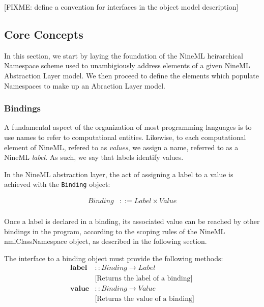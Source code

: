 \documentclass[a4paper]{article}
\newcommand\nmlClass[1]{{\tt #1}}
\begin{document}
[FIXME: define a convention for interfaces in the object model description]

\subsection{Core Concepts}

In this section, we start by laying the foundation of the NineML
heirarchical Namespace scheme used to unambigiously address elements
of a given NineML Abstraction Layer model.  We then proceed to define the elements
which populate Namespaces to make up an Abraction Layer model.

\subsubsection{Bindings}

A fundamental aspect of the organization of most programming languages
is to use names to refer to computational entities.  Likewise, to each
computational element of NineML, refered to as \emph{values}, we
assign a name, referred to as a NineML \emph{label}.  As such, we say
that labels identify values.

In the NineML abstraction layer, the act of assigning a label to a value is achieved
with the \nmlClass{Binding} object:

\begin{equation*}
\begin{array}{ll}
   Binding & ::= Label \times Value \\
\end{array}
\end{equation*}

Once a label is declared in a binding, its associated value can be
reached by other bindings in the program, according to the scoping
rules of the NineML nmlClass{Namespace} object, as described in the
following section.

The interface to a binding object must provide the following methods:
\begin{equation*}
\begin{array}{ll}
   \mathbf{label} & :: Binding \rightarrow Label \\ & \textrm{[Returns the label of a binding]} \\
   \mathbf{value} & :: Binding \rightarrow Value \\ & \textrm{[Returns the value of a binding]} \\
\end{array}
\end{equation*}
\end{document}
